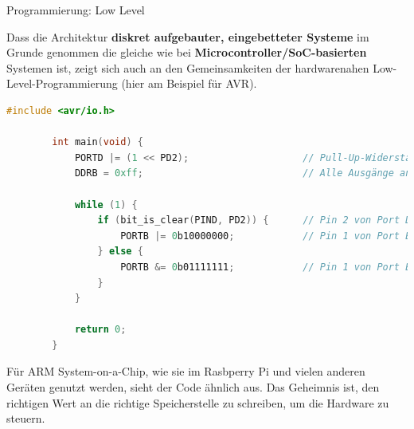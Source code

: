 \begin{frame}[fragile]{Programmierung: Low Level}
    \parbox{\linewidth}{
        \footnotesize
        Dass die Architektur \textbf{diskret aufgebauter, eingebetteter Systeme}
        im Grunde genommen die gleiche wie bei \textbf{Microcontroller/SoC-basierten}
        Systemen ist, zeigt sich auch an den Gemeinsamkeiten der hardwarenahen
        Low-Level-Programmierung (hier am Beispiel für AVR).
    }

    \bigskip

    \begin{lstlisting}[language=C, gobble=8]
        #include <avr/io.h>

        int main(void) {
            PORTD |= (1 << PD2);                    // Pull-Up-Widerstand aktivieren
            DDRB = 0xff;                            // Alle Ausgänge an Port B ausschalten

            while (1) {
                if (bit_is_clear(PIND, PD2)) {      // Pin 2 von Port D auf Ground gezogen?
                    PORTB |= 0b10000000;            // Pin 1 von Port B einschalten
                } else {
                    PORTB &= 0b01111111;            // Pin 1 von Port B ausschalten
                }
            }

            return 0;
        }
    \end{lstlisting}

    \bigskip

    \parbox{\linewidth}{
        \footnotesize
        Für ARM System-on-a-Chip, wie sie im Rasbperry Pi und vielen anderen Geräten
        genutzt werden, sieht der Code ähnlich aus. Das Geheimnis ist, den richtigen
        Wert an die richtige Speicherstelle zu schreiben, um die Hardware zu steuern.
    }
\end{frame}

